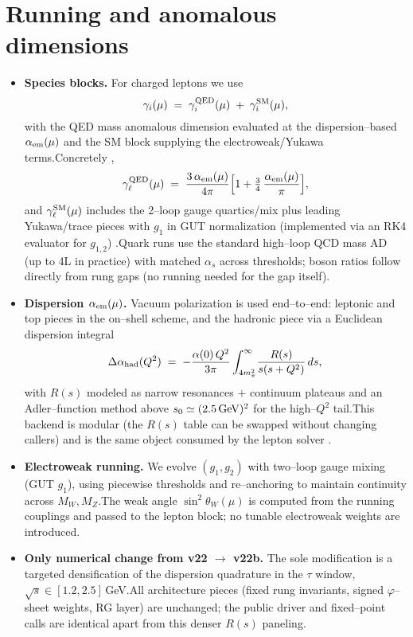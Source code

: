 \documentclass[11pt]{article}
\begin{document}
\section{Running and anomalous dimensions}
\begin{itemize}
  \item \textbf{Species blocks.} For charged leptons we use
  \[
  \gamma_i(\mu)\;=\;\gamma^{\rm QED}_i(\mu)\;+\;\gamma^{\rm SM}_i(\mu),
  \]
  with the QED mass anomalous dimension evaluated at the dispersion--based $\alpha_{\rm em}(\mu)$ and the SM block supplying the electroweak/Yukawa terms.\;Concretely \cite{Tarrach1981},
  \[
  \gamma^{\rm QED}_\ell(\mu)\;=\;\frac{3\,\alpha_{\rm em}(\mu)}{4\pi}\Bigl[1+\tfrac{3}{4}\,\frac{\alpha_{\rm em}(\mu)}{\pi}\Bigr],
  \]
  and $\gamma^{\rm SM}_\ell(\mu)$ includes the 2--loop gauge quartics/mix plus leading Yukawa/trace pieces with $g_1$ in GUT normalization (implemented via an RK4 evaluator for $g_{1,2}$) \cite{MachacekVaughn1983-85,Buttazzo2013}.\;Quark runs use the standard high--loop QCD mass AD (up to 4L in practice) with matched $\alpha_s$ across thresholds; boson ratios follow directly from rung gaps (no running needed for the gap itself).

  \item \textbf{Dispersion $\alpha_{\rm em}(\mu)$.} Vacuum polarization is used end--to--end:
  leptonic and top pieces in the on--shell scheme, and the hadronic piece via a Euclidean dispersion integral
  \[
  \Delta\alpha_{\rm had}(Q^2)\;=\;-\frac{\alpha(0)\,Q^2}{3\pi}\int_{4m_\pi^2}^{\infty}\!\frac{R(s)}{s(s+Q^2)}\,ds,
  \]
  with $R(s)$ modeled as narrow resonances $+$ continuum plateaus and an Adler--function method above $s_0\simeq(2.5\,{\rm GeV})^2$ for the high--$Q^2$ tail.\;This backend is modular (the $R(s)$ table can be swapped without changing callers) and is the same object consumed by the lepton solver \cite{EidelmanJegerlehner1995,Jegerlehner2003,Keshavarzi2019,Davier2017}.

  \item \textbf{Electroweak running.} We evolve $(g_1,g_2)$ with two--loop gauge mixing (GUT $g_1$), using piecewise thresholds and re--anchoring to maintain continuity across $M_W,M_Z$.\;The weak angle $\sin^2\theta_W(\mu)$ is computed from the running couplings and passed to the lepton block; no tunable electroweak weights are introduced.

  \item \textbf{Only numerical change from v22 $\to$ v22b.} The sole modification is a targeted densification of the dispersion quadrature in the $\tau$ window, $\sqrt{s}\!\in[1.2,2.5]$\,GeV.\;All architecture pieces (fixed rung invariants, signed $\varphi$--sheet weights, RG layer) are unchanged; the public driver and fixed--point calls are identical apart from this denser $R(s)$ paneling.


\end{itemize}
\end{document}
